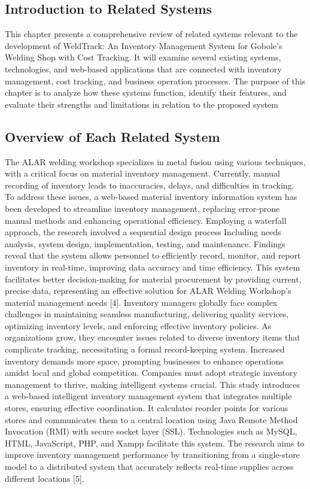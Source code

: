 \documentclass[12pt, letterpaper]{article}
\begin{document}
\subsection{Introduction to Related Systems}
   \hspace*{2em}This chapter presents a comprehensive review of related systems relevant to the development of WeldTrack: An Inventory Management System for Gobole’s Welding Shop with Cost Tracking. It will examine several existing systems, technologies, and web-based applications that are connected with inventory management, cost tracking, and business operation processes. The purpose of this chapter is to analyze how these systems function, identify their features, and evaluate their strengths and limitations in relation to the proposed system
\subsection{Overview of Each Related System}
   \hspace*{2em} The ALAR welding workshop specializes in metal fusion using various techniques, with a critical focus on material inventory management. Currently, manual recording of inventory leads to inaccuracies, delays, and difficulties in tracking. To address these issues, a web-based material inventory information system has been developed to streamline inventory management, replacing error-prone manual methods and enhancing operational efficiency. Employing a waterfall approach, the research involved a sequential design process Including needs analysis, system design, implementation, testing, and maintenance. Findings reveal that the system allows personnel to efficiently record, monitor, and report inventory in real-time, improving data accuracy and time efficiency. This system facilitates better decision-making for material procurement by providing current, precise data, representing an effective solution for ALAR Welding Workshop’s material management needs [4]. 
\hspace*{2em}Inventory managers globally face complex challenges in maintaining seamless manufacturing, delivering quality services, optimizing inventory levels, and enforcing effective inventory policies. As organizations grow, they encounter issues related to diverse inventory items that complicate tracking, necessitating a formal record-keeping system. Increased inventory demands more space, prompting businesses to enhance operations amidst local and global competition. Companies must adopt strategic inventory management to thrive, making intelligent systems crucial. This study introduces a web-based intelligent inventory management system that integrates multiple stores, ensuring effective coordination. It calculates reorder points for various stores and communicates them to a central location using Java Remote Method Invocation (RMI) with secure socket layer (SSL). Technologies such as MySQL, HTML, JavaScript, PHP, and Xampp facilitate this system. The research aims to improve inventory management performance by transitioning from a single-store model to a distributed system that accurately reflects real-time supplies across different locations [5].
\end{document}
